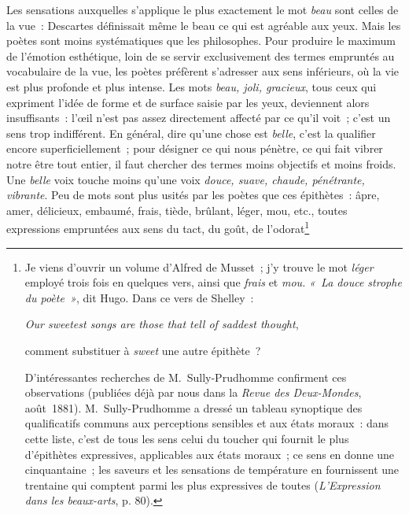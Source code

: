 \documentclass[french,twoside]{book} %
\newcommand\foreign[1]{\emph{#1}}
\begin{document}
 Les sensations auxquelles s’applique le plus exactement le mot \emph{beau} sont celles de la vue : Descartes définissait même le beau ce qui est agréable aux yeux. Mais les poètes sont moins systématiques que les philosophes. Pour produire le maximum de l’émotion esthétique, loin de se servir exclusivement des termes empruntés au vocabulaire de la vue, les poètes préfèrent s’adresser aux sens inférieurs, où la vie est plus profonde et plus intense. Les mots \emph{beau, joli, gracieux}, tous ceux qui expriment l’idée de forme et de surface saisie par les yeux, deviennent alors insuffisants : l’œil n’est pas assez directement affecté par ce qu’il voit ; c’est un sens trop indifférent. En général, dire qu’une chose est \emph{belle}, c’est la qualifier encore superficiellement ; pour désigner ce qui nous pénètre, ce qui fait vibrer notre être tout entier, il faut chercher des termes moins objectifs et moins froids. Une \emph{belle} voix touche moins qu’une voix \emph{douce, suave, chaude, pénétrante, vibrante}. Peu de mots sont plus usités par les poètes que ces épithètes : âpre, amer, délicieux, embaumé, frais, tiède, brûlant, léger, mou, etc., toutes expressions empruntées aux sens du tact, du goût, de l’odorat\footnote{\noindent Je viens d’ouvrir un volume d’Alfred de Musset ; j’y trouve le mot \emph{léger} employé trois fois en quelques vers, ainsi que \emph{frais} et \emph{mou.} \emph{« La \emph{douce} strophe du poète »}, dit Hugo. Dans ce vers de Shelley :\par
\foreign{\emph{Our sweetest songs are those that tell of saddest thought}},\\
\par
\noindent comment substituer à \foreign{\emph{sweet}} une autre épithète ?\par
D’intéressantes recherches de M. Sully-Prudhomme confirment ces observations (publiées déjà par nous dans la \emph{Revue des Deux-Mondes}, août 1881). M. Sully-Prudhomme a dressé un tableau synoptique des qualificatifs communs aux perceptions sensibles et aux états moraux : dans cette liste, c’est de tous les sens celui du toucher qui fournit le plus d’épithètes expressives, applicables aux états moraux ; ce sens en donne une cinquantaine ; les saveurs et les sensations de température en fournissent une trentaine qui comptent parmi les plus expressives de toutes (\emph{L’Expression dans les beaux-arts}, p. 80).
}
\end{document}
